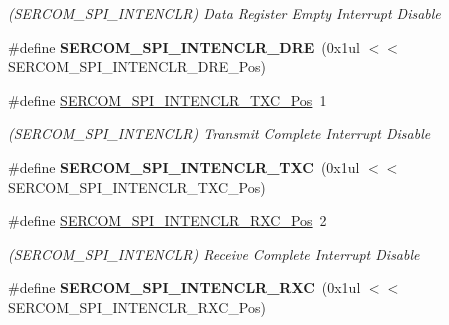 \begin{DoxyCompactItemize}
\begin{DoxyCompactList}\small\item\em (S\+E\+R\+C\+O\+M\+\_\+\+S\+P\+I\+\_\+\+I\+N\+T\+E\+N\+C\+L\+R) Data Register Empty Interrupt Disable \end{DoxyCompactList}\item 
\hypertarget{group___s_a_m_l21___s_e_r_c_o_m_ga1cdf24a1a99f645bc1acb78584d03431}{}\#define {\bfseries S\+E\+R\+C\+O\+M\+\_\+\+S\+P\+I\+\_\+\+I\+N\+T\+E\+N\+C\+L\+R\+\_\+\+D\+R\+E}~(0x1ul $<$$<$ S\+E\+R\+C\+O\+M\+\_\+\+S\+P\+I\+\_\+\+I\+N\+T\+E\+N\+C\+L\+R\+\_\+\+D\+R\+E\+\_\+\+Pos)\label{group___s_a_m_l21___s_e_r_c_o_m_ga1cdf24a1a99f645bc1acb78584d03431}

\item 
\hypertarget{group___s_a_m_l21___s_e_r_c_o_m_gaae47bd3f4e2b890ceb1fc0dd463b817d}{}\#define \hyperlink{group___s_a_m_l21___s_e_r_c_o_m_gaae47bd3f4e2b890ceb1fc0dd463b817d}{S\+E\+R\+C\+O\+M\+\_\+\+S\+P\+I\+\_\+\+I\+N\+T\+E\+N\+C\+L\+R\+\_\+\+T\+X\+C\+\_\+\+Pos}~1\label{group___s_a_m_l21___s_e_r_c_o_m_gaae47bd3f4e2b890ceb1fc0dd463b817d}

\begin{DoxyCompactList}\small\item\em (S\+E\+R\+C\+O\+M\+\_\+\+S\+P\+I\+\_\+\+I\+N\+T\+E\+N\+C\+L\+R) Transmit Complete Interrupt Disable \end{DoxyCompactList}\item 
\hypertarget{group___s_a_m_l21___s_e_r_c_o_m_ga38ec2463cb2950f967095bc30cf64f82}{}\#define {\bfseries S\+E\+R\+C\+O\+M\+\_\+\+S\+P\+I\+\_\+\+I\+N\+T\+E\+N\+C\+L\+R\+\_\+\+T\+X\+C}~(0x1ul $<$$<$ S\+E\+R\+C\+O\+M\+\_\+\+S\+P\+I\+\_\+\+I\+N\+T\+E\+N\+C\+L\+R\+\_\+\+T\+X\+C\+\_\+\+Pos)\label{group___s_a_m_l21___s_e_r_c_o_m_ga38ec2463cb2950f967095bc30cf64f82}

\item 
\hypertarget{group___s_a_m_l21___s_e_r_c_o_m_ga6c65bec9d88a41ae774abf77b86f79d0}{}\#define \hyperlink{group___s_a_m_l21___s_e_r_c_o_m_ga6c65bec9d88a41ae774abf77b86f79d0}{S\+E\+R\+C\+O\+M\+\_\+\+S\+P\+I\+\_\+\+I\+N\+T\+E\+N\+C\+L\+R\+\_\+\+R\+X\+C\+\_\+\+Pos}~2\label{group___s_a_m_l21___s_e_r_c_o_m_ga6c65bec9d88a41ae774abf77b86f79d0}

\begin{DoxyCompactList}\small\item\em (S\+E\+R\+C\+O\+M\+\_\+\+S\+P\+I\+\_\+\+I\+N\+T\+E\+N\+C\+L\+R) Receive Complete Interrupt Disable \end{DoxyCompactList}\item 
\hypertarget{group___s_a_m_l21___s_e_r_c_o_m_ga115ecf3e156278dfd16ca3340f18e8c8}{}\#define {\bfseries S\+E\+R\+C\+O\+M\+\_\+\+S\+P\+I\+\_\+\+I\+N\+T\+E\+N\+C\+L\+R\+\_\+\+R\+X\+C}~(0x1ul $<$$<$ S\+E\+R\+C\+O\+M\+\_\+\+S\+P\+I\+\_\+\+I\+N\+T\+E\+N\+C\+L\+R\+\_\+\+R\+X\+C\+\_\+\+Pos)\label{group___s_a_m_l21___s_e_r_c_o_m_ga115ecf3e156278dfd16ca3340f18e8c8}


\end{DoxyCompactItemize}
